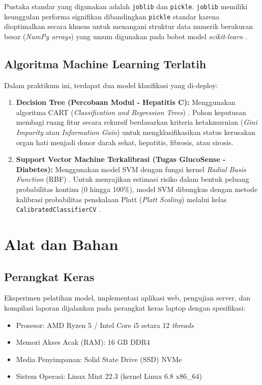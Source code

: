 \documentclass[a4paper,oneside,12pt]{report}
\begin{document}
Pustaka standar yang digunakan adalah \texttt{joblib} dan \texttt{pickle}. \texttt{joblib} memiliki keunggulan performa signifikan dibandingkan \texttt{pickle} standar karena dioptimalkan secara khusus untuk menangani struktur data numerik berukuran besar (\textit{NumPy arrays}) yang umum digunakan pada bobot model \textit{scikit-learn} \cite{joblib-persistence}.

\section{Algoritma Machine Learning Terlatih}
Dalam praktikum ini, terdapat dua model klasifikasi yang di-deploy:
\begin{enumerate}[noitemsep, topsep=3pt, parsep=2pt]
	\item \textbf{Decision Tree (Percobaan Modul - Hepatitis C):} Menggunakan algoritma CART (\textit{Classification and Regression Trees}) \cite{breiman1984}. Pohon keputusan membagi ruang fitur secara rekursif berdasarkan kriteria ketakmurnian (\textit{Gini Impurity} atau \textit{Information Gain}) untuk mengklasifikasikan status kerusakan organ hati menjadi donor darah sehat, hepatitis, fibrosis, atau sirosis.
	\item \textbf{Support Vector Machine Terkalibrasi (Tugas GlucoSense - Diabetes):} Menggunakan model SVM dengan fungsi kernel \textit{Radial Basis Function} (RBF) \cite{cortes1995}. Untuk menyajikan estimasi risiko dalam bentuk peluang probabilitas kontinu (0 hingga 100\%), model SVM dibungkus dengan metode kalibrasi probabilitas penskalaan Platt (\textit{Platt Scaling}) melalui kelas \texttt{CalibratedClassifierCV} \cite{platt1999,sklearn-calibration}.
\end{enumerate}

\clearpage

\chapter{Alat dan Bahan}

\section{Perangkat Keras}
Eksperimen pelatihan model, implementasi aplikasi web, pengujian server, dan kompilasi laporan dijalankan pada perangkat keras laptop dengan spesifikasi:
\begin{itemize}[noitemsep, topsep=2pt, parsep=1pt]
	\item Prosesor: AMD Ryzen 5 / Intel Core i5 setara 12 \textit{threads}
	\item Memori Akses Acak (RAM): 16 GB DDR4
	\item Media Penyimpanan: Solid State Drive (SSD) NVMe
	\item Sistem Operasi: Linux Mint 22.3 (kernel Linux 6.8 x86\_64)
\end{itemize}
\end{document}
